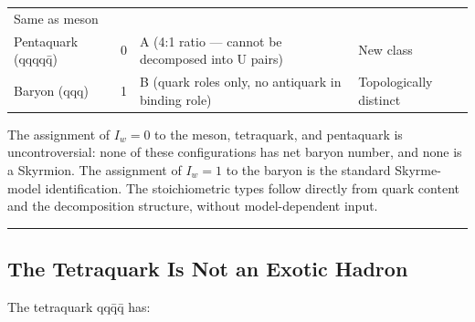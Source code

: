 \documentclass[12pt,a4paper]{article}
\begin{document}
\begin{longtable}[]{@{}llll@{}}
\begin{minipage}[t]{0.22\columnwidth}
Same as meson\strut
\end{minipage}\tabularnewline
\begin{minipage}[t]{0.22\columnwidth}\raggedright
Pentaquark (qqqqq̄)\strut
\end{minipage} & \begin{minipage}[t]{0.22\columnwidth}\raggedright
0\strut
\end{minipage} & \begin{minipage}[t]{0.22\columnwidth}\raggedright
A (4:1 ratio --- cannot be decomposed into U pairs)\strut
\end{minipage} & \begin{minipage}[t]{0.22\columnwidth}\raggedright
New class\strut
\end{minipage}\tabularnewline
\begin{minipage}[t]{0.22\columnwidth}\raggedright
Baryon (qqq)\strut
\end{minipage} & \begin{minipage}[t]{0.22\columnwidth}\raggedright
1\strut
\end{minipage} & \begin{minipage}[t]{0.22\columnwidth}\raggedright
B (quark roles only, no antiquark in binding role)\strut
\end{minipage} & \begin{minipage}[t]{0.22\columnwidth}\raggedright
Topologically distinct\strut
\end{minipage}\tabularnewline
\bottomrule
\end{longtable}

The assignment of \(I_w = 0\) to the meson, tetraquark, and pentaquark
is uncontroversial: none of these configurations has net baryon number,
and none is a Skyrmion. The assignment of \(I_w = 1\) to the baryon is
the standard Skyrme- model identification. The stoichiometric types
follow directly from quark content and the decomposition structure,
without model-dependent input.

\begin{center}\rule{0.5\linewidth}{0.5pt}\end{center}

\hypertarget{the-tetraquark-is-not-an-exotic-hadron}{%
\subsection{The Tetraquark Is Not an Exotic
Hadron}\label{the-tetraquark-is-not-an-exotic-hadron}}

The tetraquark qqq̄q̄ has:
\end{document}
